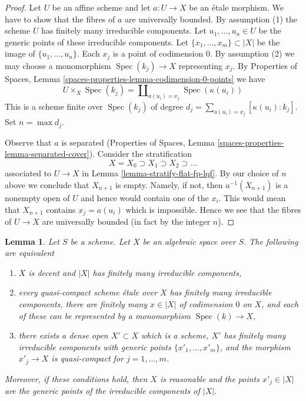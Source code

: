 \documentclass{stacks-project}
\theoremstyle{plain}
\newtheorem{lemma}[subsection]{Lemma}
\theoremstyle{definition}
\theoremstyle{remark}
\numberwithin{equation}{subsection}
\def\Spec{\mathop{\mathrm{Spec}}}
\begin{document}
\begin{proof}
Let $U$ be an affine scheme and let $a : U \to X$ be an \'etale morphism.
We have to show that the fibres of $a$ are universally bounded. By
assumption (1) the scheme $U$ has finitely many irreducible components.
Let $u_1, \ldots, u_n \in U$ be the generic points of these irreducible
components. Let $\{x_1, \ldots, x_m\} \subset |X|$ be the image
of $\{u_1, \ldots, u_n\}$. Each $x_j$ is a point of codimension $0$.
By assumption (2) we may choose a monomorphism $\Spec(k_j) \to X$
representing $x_j$. By Properties of Spaces, Lemma
\ref{spaces-properties-lemma-codimension-0-points} we have
$$
U \times_X \Spec(k_j) = \coprod\nolimits_{a(u_i) = x_j} \Spec(\kappa(u_i))
$$
This is a scheme finite over $\Spec(k_j)$ of degree
$d_j = \sum_{a(u_i) = x_j} [\kappa(u_i) : k_j]$. Set $n = \max d_j$.

\medskip\noindent
Observe that $a$ is separated
(Properties of Spaces, Lemma \ref{spaces-properties-lemma-separated-cover}).
Consider the stratification
$$
X = X_0 \supset X_1 \supset X_2 \supset \ldots
$$
associated to $U \to X$ in Lemma \ref{lemma-stratify-flat-fp-lqf}.
By our choice of $n$ above we conclude that $X_{n + 1}$ is empty.
Namely, if not, then $a^{-1}(X_{n + 1})$ is a nonempty open
of $U$ and hence would contain one of the $x_i$. This would mean
that $X_{n + 1}$ contains $x_j = a(u_i)$ which is impossible.
Hence we see that the fibres of $U \to X$ are universally bounded
(in fact by the integer $n$).
\end{proof}

\begin{lemma}
\label{lemma-finitely-many-irreducible-components}
Let $S$ be a scheme. Let $X$ be an algebraic space over $S$.
The following are equivalent
\begin{enumerate}
\item $X$ is decent and $|X|$ has finitely many irreducible components,
\item every quasi-compact scheme \'etale over $X$ has finitely many
irreducible components, there are finitely many $x \in |X|$ of
codimension $0$ on $X$, and each of these can be represented
by a monomorphism $\Spec(k) \to X$,
\item there exists a dense open $X' \subset X$ which is
a scheme, $X'$ has finitely many irreducible components
with generic points $\{x'_1, \ldots, x'_m\}$, and
the morphism $x'_j \to X$ is quasi-compact for $j = 1, \ldots, m$.
\end{enumerate}
Moreover, if these conditions hold, then $X$ is reasonable and the
points $x'_j \in |X|$ are the generic points of the irreducible
components of $|X|$.
\end{lemma}
\end{document}
